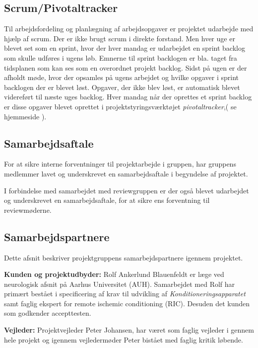 \subsection{Scrum/Pivotaltracker} \label{title:scrum}
Til arbejdsfordeling og planlægning af arbejdsopgaver er projektet udarbejde med hjælp af scrum. Der er ikke brugt scrum i direkte forstand. Men hver uge er blevet set som en sprint, hvor der hver mandag er udarbejdet en sprint backlog som skulle udføres i ugens løb. Emnerne til sprint backlogen er bla. taget fra tidsplanen som kan ses som en overordnet projekt backlog. Sidst på ugen er der afholdt møde, hvor der opsamles på ugens arbejdet og hvilke opgaver i sprint backlogen der er blevet løst. Opgaver, der ikke blev løst, er automatisk blevet videreført til næste uges backlog. Hver mandag når der oprettes et sprint backlog er disse opgaver blevet oprettet i projektstyringsværktøjet \textit{pivotaltracker},( se hjemmeside ). 

\subsection{Samarbejdsaftale}
For at sikre interne forventninger til projektarbejde i gruppen, har gruppens medlemmer lavet og underskrevet en samarbejdsaftale i begyndelse af projektet. 

I forbindelse med samarbejdet med reviewgruppen er der også blevet udarbejdet og underskrevet en samarbejdsaftale, for at sikre ens forventning til reviewmøderne. 

\subsection{Samarbejdspartnere}
Dette afsnit beskriver projektgruppens samarbejdspartnere igennem projektet. 

\textbf{Kunden og projektudbyder:} Rolf Ankerlund Blauenfeldt er læge ved neurologisk afsnit på Aarhus Universitet (AUH). Samarbejdet med Rolf har primært bestået i specificering af krav til udvikling af \textit{Konditioneringsapparatet} samt faglig ekspert for remote ischemic conditioning (RIC). Desuden det kunden som godkender accepttesten.

\textbf{Vejleder:} Projektvejleder Peter Johansen, har været som faglig vejleder i gennem hele projekt og igennem vejledermøder Peter bistået med faglig kritik løbende. 

